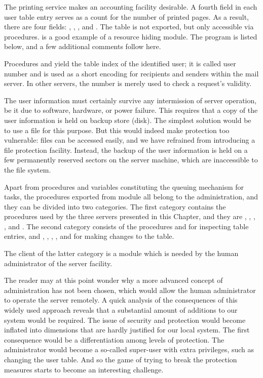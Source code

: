 The printing service makes an accounting facility desirable. A fourth field in each user table entry serves as a count for the number of printed pages. As a result, there are four fields: , , , and . The table is not exported, but only accessible via procedures.  is a good example of a resource hiding module. The program is listed below, and a few additional comments follow here.

Procedures  and  yield the table index of the identified user; it is called user number and is used as a short encoding for recipients and senders within the mail server. In other servers, the number is merely used to check a request's validity.

The user information must certainly survive any intermission of server operation, be it due to software, hardware, or power failure. This requires that a copy of the user information is held on backup store (disk). The simplest solution would be to use a file for this purpose. But this would indeed make protection too vulnerable: files can be accessed easily, and we have refrained from introducing a file protection facility. Instead, the backup of the user information is held on a few permanently reserved sectors on the server machine, which are inaccessible to the file system.

Apart from procedures and variables constituting the queuing mechanism for tasks, the procedures exported from module  all belong to the administration, and they can be divided into two categories. The first category contains the procedures used by the three servers presented in this Chapter, and they are , , , ,  and . The second category consists of the procedures  and  for inspecting table entries, and , , , , and  for making changes to the table.

The client of the latter category is a module  which is needed by the human administrator of the server facility.

The reader may at this point wonder why a more advanced concept of administration has not been chosen, which would allow the human administrator to operate the server remotely. A quick analysis of the consequences of this widely used approach reveals that a substantial amount of additions to our system would be required. The issue of security and protection would become inflated into dimensions that are hardly justified for our local system. The first consequence would be a differentiation among levels of protection. The administrator would become a so-called super-user with extra privileges, such as changing the user table. And so the game of trying to break the protection measures starts to become an interesting challenge.


